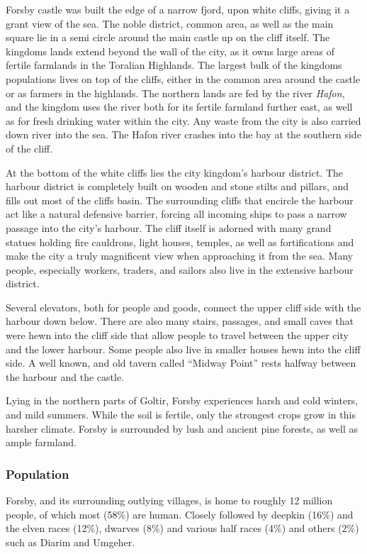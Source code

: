 Forsby castle was built the edge of a narrow fjord, upon white cliffs, giving
it a grant view of the sea. The noble district, common area, as well as the
main square lie in a semi circle around the main castle up on the cliff
itself. The kingdoms lands extend beyond the wall of the city, as it owns
large areas of fertile farmlands in the Toralian Highlands. The largest
bulk of the kingdoms populations lives on top of the cliffs, either in the
common area around the castle or as farmers in the highlands. The northern
lands are fed by the river \emph{Hafon}, and the kingdom uses the river both
for its fertile farmland further east, as well as for fresh drinking water
within the city. Any waste from the city is also carried down river into the
sea. The Hafon river crashes into the bay at the southern side of the cliff.

At the bottom of the white cliffs lies the city kingdom's harbour district. The
harbour district is completely built on wooden and stone stilts and pillars,
and fills out most of the cliffs basin. The surrounding cliffs that encircle
the harbour act like a natural defensive barrier, forcing all incoming ships
to pass a narrow passage into the city's harbour. The cliff itself is adorned
with many grand statues holding fire cauldrons, light houses, temples, as well
as fortifications and make the city a truly magnificent view when approaching
it from the sea. Many people, especially workers, traders, and sailors also
live in the extensive harbour district.

Several elevators, both for people and goods, connect the upper cliff side
with the harbour down below. There are also many stairs, passages, and small
caves that were hewn into the cliff side that allow people to travel between
the upper city and the lower harbour. Some people also live in smaller houses
hewn into the cliff side. A well known, and old tavern called ``Midway Point''
rests halfway between the harbour and the castle.

Lying in the northern parts of Goltir, Forsby experiences harsh and cold
winters, and mild summers. While the soil is fertile, only the strongest crops
grow in this harsher climate. Forsby is surrounded by lush and ancient pine
forests, as well as ample farmland.

\subsubsection{Population}

Forsby, and its surrounding outlying villages, is home to roughly 12 million
people, of which most (58\%) are human. Closely followed by deepkin (16\%)
and the elven races (12\%), dwarves (8\%) and various half races (4\%) and
others (2\%) such as Diarim and Umgeher.

